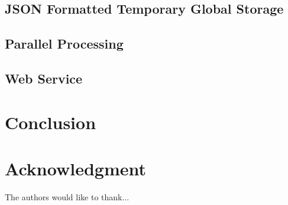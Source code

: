 \documentclass[conference]{IEEEtran}
\begin{document}
\subsection{JSON Formatted Temporary Global Storage}
\blindtext

\subsection{Parallel Processing}
\blindtext

\subsection{Web Service}
\blindtext


\section{Conclusion}
\blindtext 


\section*{Acknowledgment}
The authors would like to thank...

\ifCLASSOPTIONcaptionsoff
  \newpage
\fi




\end{document}
